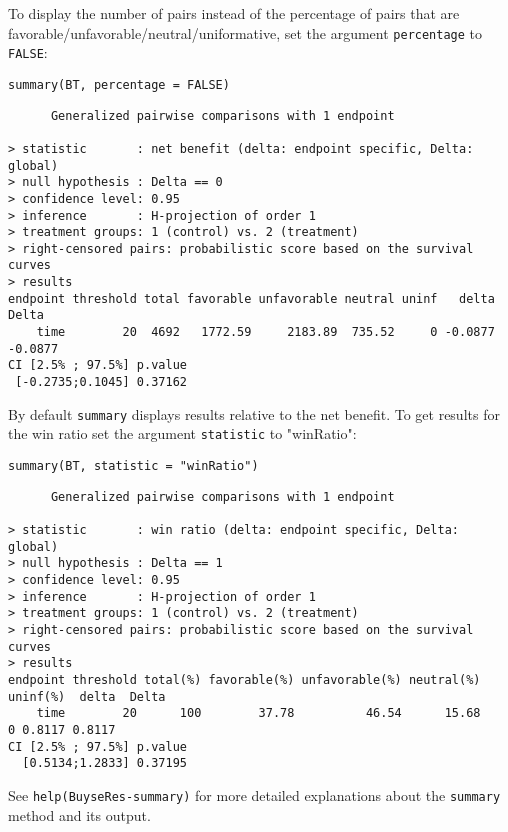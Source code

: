 \documentclass[12pt]{article}
\begin{document}
\clearpage

 To display the number of pairs instead of the percentage of pairs
that are favorable/unfavorable/neutral/uniformative, set the argument
\texttt{percentage} to \texttt{FALSE}:
\lstset{language=r,label= ,caption= ,captionpos=b,numbers=none}
\begin{lstlisting}
summary(BT, percentage = FALSE)
\end{lstlisting}

\begin{verbatim}
      Generalized pairwise comparisons with 1 endpoint

> statistic       : net benefit (delta: endpoint specific, Delta: global) 
> null hypothesis : Delta == 0 
> confidence level: 0.95 
> inference       : H-projection of order 1
> treatment groups: 1 (control) vs. 2 (treatment) 
> right-censored pairs: probabilistic score based on the survival curves
> results
endpoint threshold total favorable unfavorable neutral uninf   delta   Delta
    time        20  4692   1772.59     2183.89  735.52     0 -0.0877 -0.0877
CI [2.5% ; 97.5%] p.value 
 [-0.2735;0.1045] 0.37162
\end{verbatim}

\bigskip

By default \texttt{summary} displays results relative to the net benefit. To
get results for the win ratio set the argument \texttt{statistic} to
"winRatio":
\lstset{language=r,label= ,caption= ,captionpos=b,numbers=none}
\begin{lstlisting}
summary(BT, statistic = "winRatio")
\end{lstlisting}

\begin{verbatim}
      Generalized pairwise comparisons with 1 endpoint

> statistic       : win ratio (delta: endpoint specific, Delta: global) 
> null hypothesis : Delta == 1 
> confidence level: 0.95 
> inference       : H-projection of order 1
> treatment groups: 1 (control) vs. 2 (treatment) 
> right-censored pairs: probabilistic score based on the survival curves
> results
endpoint threshold total(%) favorable(%) unfavorable(%) neutral(%) uninf(%)  delta  Delta
    time        20      100        37.78          46.54      15.68        0 0.8117 0.8117
CI [2.5% ; 97.5%] p.value 
  [0.5134;1.2833] 0.37195
\end{verbatim}

See \texttt{help(BuyseRes-summary)} for more detailed explanations about the
\texttt{summary} method and its output.
\end{document}
